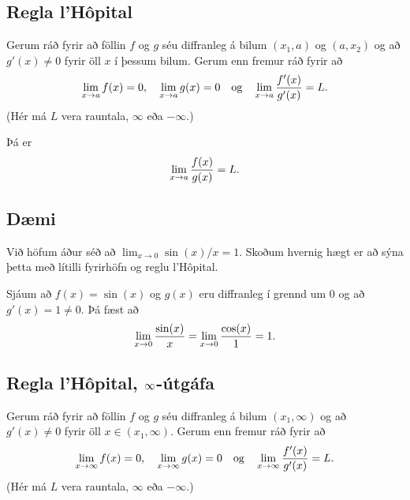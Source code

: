 \documentclass[b5paper,10pt,icelandic]{sphinxmanual}
\begin{document}
\subsection{Regla l’Hôpital}
\label{kafli03:id23}
Gerum ráð fyrir að föllin \(f\) og \(g\) séu diffranleg á bilum
\((x_1, a)\) og \((a, x_2)\) og að \(g'(x)\neq 0\) fyrir öll
\(x\) í þessum bilum.
Gerum enn fremur ráð fyrir að
\begin{gather}
\begin{split}\lim_{x\rightarrow a}f(x)=0, \quad \lim_{x\rightarrow a}g(x)=0
\quad\mbox{og}\quad \lim_{x\rightarrow a}\frac{f'(x)}{g'(x)}=L.\end{split}\notag
\end{gather}
(Hér má \(L\) vera rauntala, \(\infty\) eða \(-\infty\).)

Þá er
\begin{gather}
\begin{split}\lim_{x\rightarrow a}\frac{f(x)}{g(x)}=L.\end{split}\notag
\end{gather}

\subsection{Dæmi}
\label{kafli03:id24}
Við höfum áður séð að \(\lim_{x\to 0} \sin(x)/x = 1\).
Skoðum hvernig hægt er að sýna þetta með lítilli fyrirhöfn og reglu l’Hôpital.

Sjáum að \(f(x) = \sin(x)\) og \(g(x)\) eru diffranleg í grennd um 0
og að \(g'(x) = 1 \neq 0\). Þá fæst að
\begin{gather}
\begin{split}\lim_{x \to 0} \frac{\sin(x)}{x} = \lim_{x \to 0} \frac{\cos(x)}{1} = 1.\end{split}\notag
\end{gather}

\subsection{Regla l’Hôpital, \protect\(\infty\protect\)-útgáfa}
\label{kafli03:regla-lhopital-utgafa}
Gerum ráð fyrir að föllin \(f\) og \(g\) séu diffranleg á bilum
\((x_1, \infty)\) og að \(g'(x)\neq 0\) fyrir öll
\(x\in (x_1, \infty)\). Gerum enn fremur ráð fyrir að
\begin{gather}
\begin{split}\lim_{x\rightarrow \infty}f(x)=0, \quad \lim_{x\rightarrow \infty}g(x)=0
\quad\mbox{og}\quad \lim_{x\rightarrow \infty}\frac{f'(x)}{g'(x)}=L.\end{split}\notag
\end{gather}
(Hér má \(L\) vera rauntala, \(\infty\) eða \(-\infty\).)
\end{document}
